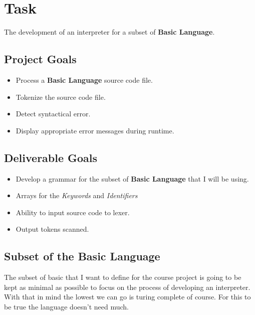 \documentclass{report}
\begin{document}


\section*{Task}
The development of an interpreter for a subset of \textbf{Basic Language}. 

\vspace{0.5cm}

\subsection*{Project Goals}
\begin{itemize}
	\item Process a \textbf{Basic Language} source code file. 
	\item Tokenize the source code file. 
	\item Detect syntactical error.
	\item Display appropriate error messages during runtime. 
\end{itemize}

\subsection*{Deliverable Goals}
\begin{itemize}
	\item Develop a grammar for the subset of \textbf{Basic Language} that I will be using. 
	\item Arrays for the \emph{Keywords} and \emph{Identifiers}
	\item Ability to input source code to lexer. 
	\item Output tokens scanned. 
\end{itemize}

\subsection*{Subset of the Basic Language}
The subset of basic that I want to define for the course project is going to be kept as minimal as possible to focus on the process of developing an interpreter. 
With that in mind the lowest we can go is turing complete of course. 
For this to be true the language doesn't need much. 
\end{document}
